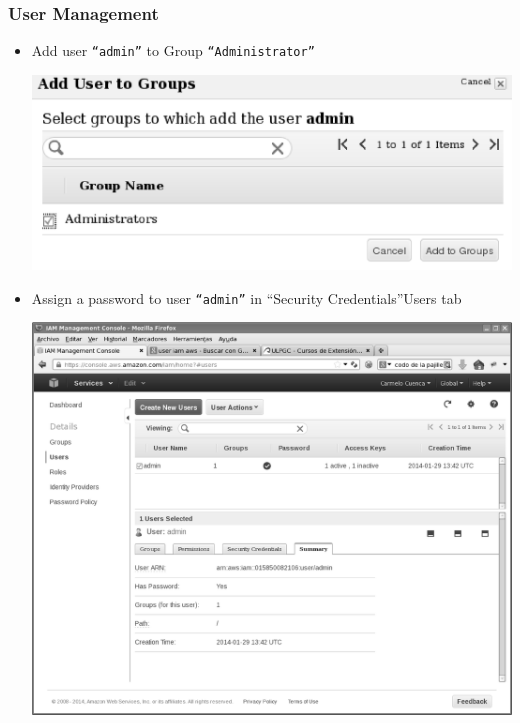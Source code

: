 \documentclass{beamer}
\begin{document}
\begin{frame}[fragile]
\frametitle{User Management}
\begin{itemize}
\item Add user \texttt{``admin''} to Group \texttt{``Administrator''}
\begin{center}
\includegraphics[scale=0.15]{addusertogroup.eps}
\end{center}
\item Assign a password to user \texttt{``admin''} in ``Security Credentials''Users tab
\begin{center}
\includegraphics[scale=0.10]{summary.eps}
\end{center}
\end{itemize}
\end{frame}
\end{document}
